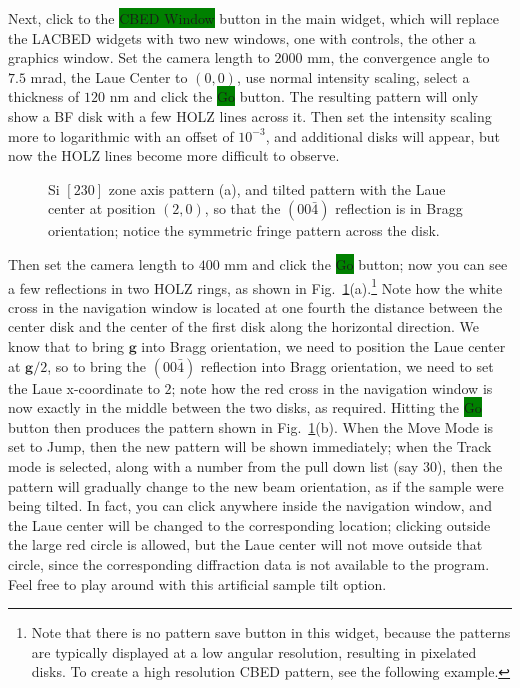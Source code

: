 \documentclass[DIV=calc, paper=letter, fontsize=11pt]{scrartcl}	 %
\newcommand{\button}[1]{\colorbox{green}{\textsf{#1}} button}
\begin{document}
Next, click to the \button{CBED Window} in the main widget, which will replace the LACBED widgets with two new windows, one with
controls, the other a graphics window.  Set the camera length to $2000$ mm, the convergence angle to $7.5$ mrad, the Laue Center to $(0,0)$,
use normal intensity scaling, select a thickness of $120$ nm and click the \button{Go}.  The resulting pattern will only show a BF disk
with a few HOLZ lines across it.  Then set the intensity scaling more to logarithmic with an offset of $10^{-3}$, and additional 
disks will appear, but now the HOLZ lines become more difficult to observe.


\begin{figure}[h]
\leavevmode\centering
{}
\caption{\label{fig:ex4}Si $[230]$ zone axis pattern (a), and tilted pattern with the Laue center at position $(2,0)$, so that the 
$(00\bar{4})$ reflection is in Bragg orientation; notice the symmetric fringe pattern across the disk.}
\end{figure}

Then set the camera length to $400$ mm and click the \button{Go}; now you can see a few reflections in two HOLZ rings, as shown in 
Fig.~\ref{fig:ex4}(a).\footnote{Note that there is no pattern save button in this widget, because the patterns are typically displayed
at a low angular resolution, resulting in pixelated disks.  To create a high resolution CBED pattern, see the following example.}
Note how the white cross in the navigation window is located at one fourth the distance between the center disk and the center of the first disk along the horizontal
direction.  We know that to bring $\mathbf{g}$ into Bragg orientation, we need to position the Laue center at $\mathbf{g}/2$, so
to bring the $(00\bar{4})$ reflection into Bragg orientation, we need to set the Laue x-coordinate to $2$;  note how the 
red cross in the navigation window is now exactly in the middle between the two disks, as required.  Hitting the \button{Go} then
produces the pattern shown in Fig.~\ref{fig:ex4}(b).  When the Move Mode is set to Jump, then the new pattern will be shown
immediately; when the Track mode is selected, along with a number from the pull down list (say $30$), then the pattern will gradually 
change to the new beam orientation, as if the sample were being tilted.  In fact, you can click anywhere inside the navigation window, 
and the Laue center will be changed to the corresponding location; clicking outside the large red circle is allowed, but the Laue 
center will not move outside that circle, since the corresponding diffraction data is not available to the program.  Feel free to play
around with this artificial sample tilt option.
\end{document}
